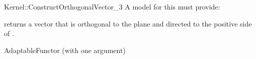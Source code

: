 \begin{ccRefFunctionObjectConcept}{Kernel::ConstructOrthogonalVector_3}
A model for this must provide:


{returns a vector that is orthogonal to the plane  and directed
 to the positive side of .}

\ccRefines
AdaptableFunctor (with one argument)

\ccSeeAlso
{} \\

\end{ccRefFunctionObjectConcept}
